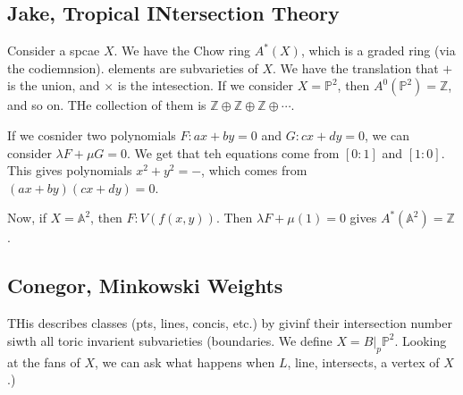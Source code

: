 \documentclass[11pt]{article}
\theoremstyle{definition}
\def\ZZ{{\mathbb Z}}
\def\PP{{\mathbb P}}
\def\AA{{\mathbb A}}
\begin{document}

\subsection{Jake, Tropical INtersection Theory}


Consider a spcae $X$. We have the Chow ring $A^*(X)$, which is a graded ring (via the codiemnsion). elements are subvarieties of $X$. We have the translation that $+$ is the union, and $\times$ is the intesection. If we consider $X=\PP^2$, then $A^0(\PP^2)=\ZZ$, and so on. THe collection of them is $\ZZ \oplus \ZZ \oplus \ZZ \oplus \cdots$. 



If we cosnider two polynomials $F:ax+by=0$ and $G:cx+dy=0$, we can consider $\lambda F+\mu G=0$. We get that teh equations come from $[0:1]$ and $[1:0]$. This gives polynomials $x^2+y^2=-$, which comes from $(ax+by)(cx+dy)=0$.



Now, if $X = \AA^2$, then $F:V(f(x,y))$. Then $\lambda F + \mu(1) =0$ gives $A^*(\AA^2) = \ZZ$.



\subsection{Conegor, Minkowski Weights}



THis describes classes (pts, lines, concis, etc.) by givinf their intersection number siwth all toric invarient subvarieties (boundaries. We define $X = B|_p \PP^2$. Looking at the fans of $X$, we can ask what happens when $L$, line, intersects, a vertex of $X$.)
\end{document}
